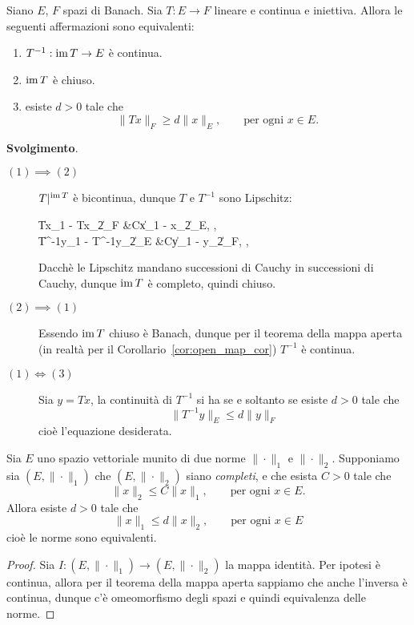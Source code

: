 \begin{exercise}
	Siano $E$, $F$ spazi di Banach. Sia $T:E \to F$ lineare e continua e iniettiva.
	Allora le seguenti affermazioni sono equivalenti:
	\begin{enumerate}
		\item $T^{-1} : \operatorname{im} T \to E$ è continua.
		\item $\operatorname{im} T$ è chiuso.
		\item esiste $d > 0$ tale che
		\begin{equation*}
			\|Tx\|_F \geq d\|x\|_E, \qquad \text{per ogni $x \in E$.}
		\end{equation*}
	\end{enumerate}

	\textbf{Svolgimento}.
	\begin{description}
		\item[$(1) \implies (2)$] $T\vert^{\operatorname{im} T}$ è bicontinua, dunque $T$ e $T^{-1}$ sono Lipschitz:
		\begin{eqalign*}
			\|Tx_1 - Tx_2\|_F &\leq C\|x_1 - x_2\|_E, \qquad {},\\
			\|T^{-1}y_1 - T^{-1}y_2\|_E &\leq C\|y_1 - y_2\|_F, \qquad {},\\
		\end{eqalign*}
		Dacchè le Lipschitz mandano successioni di Cauchy in successioni di Cauchy, dunque $\operatorname{im} T$ è completo, quindi chiuso.
		\item[$(2) \implies (1)$] Essendo $\operatorname{im} T$ chiuso è Banach, dunque per il teorema della mappa aperta (in realtà per il Corollario~\ref{cor:open_map_cor}) $T^{-1}$ è continua.
		\item[$(1) \iff (3)$] Sia $y=Tx$, la continuità di $T^{-1}$ si ha se e soltanto se esiste $d > 0$ tale che
		\begin{equation*}
			\|T^{-1}y\|_E \leq d\|y\|_F
		\end{equation*}
		cioè l'equazione desiderata.
	\end{description}
\end{exercise}

\begin{corollary}
\label{cor:equiv_norm}
	Sia $E$ uno spazio vettoriale munito di due norme $\|\cdot\|_1$ e $\|\cdot\|_2$. Supponiamo sia $(E, \|\cdot\|_1)$ che $(E, \|\cdot\|_2)$ siano \emph{completi}, e che esista $C > 0$ tale che
	\begin{equation*}
		\|x\|_2 \leq C\|x\|_1, \qquad \text{per ogni $x \in E$}.
	\end{equation*}
	Allora esiste $d > 0$ tale che
	\begin{equation*}
		\|x\|_1 \leq d \|x\|_2, \qquad \text{per ogni $x \in E$}
	\end{equation*}
	cioè le norme sono equivalenti.
\end{corollary}
\begin{proof}
	Sia $I : (E, \|\cdot\|_1) \to (E, \|\cdot\|_2)$ la mappa identità. Per ipotesi è continua, allora per il teorema della mappa aperta sappiamo che anche l'inversa è continua, dunque c'è omeomorfismo degli spazi e quindi equivalenza delle norme.
\end{proof}


